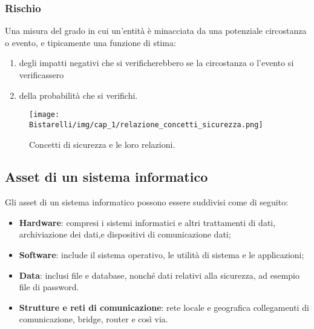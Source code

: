 \subsubsection{Rischio}
Una misura del grado in cui un'entità è minacciata da una potenziale circostanza o evento, e tipicamente una funzione di stima:
\begin{enumerate}
    \item  degli impatti negativi che si verificherebbero se la circostanza o l'evento si verificassero
    \item  della probabilità che si verifichi.
\end{enumerate}

\begin{figure}[H]
	\centering
    \texttt{[image: Bistarelli/img/cap\_1/relazione\_concetti\_sicurezza.png]}
	\caption{Concetti di sicurezza e le loro relazioni.}\label{fig:relazioni_concetti_sec}
\end{figure}

\subsection{Asset di un sistema informatico}
Gli asset di un sistema informatico possono essere suddivisi come di seguito:
\begin{itemize}
    \item \textbf{Hardware}: compresi i sistemi informatici e altri trattamenti di dati, archiviazione dei dati,e dispositivi di comunicazione dati;
    \item \textbf{Software}: include il sistema operativo, le utilità di sistema e le applicazioni;
    \item \textbf{Data}: inclusi file e database, nonché dati relativi alla sicurezza, ad esempio file di password. 
    \item \textbf{Strutture e reti di comunicazione}: rete locale e geografica collegamenti di comunicazione, bridge, router e così via.
\end{itemize}

